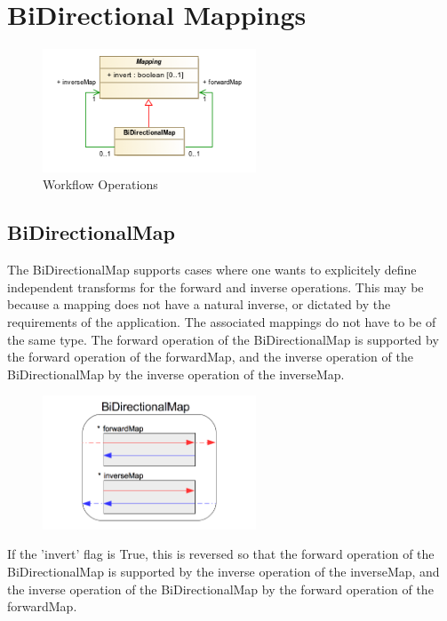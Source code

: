 \pagebreak
\section{BiDirectional Mappings}

  \begin{figure}[h]
  \begin{center}
    \includegraphics[width=2.5in]{diagrams/bidirectional_map.png}
    \caption{Workflow Operations}\label{fig:BiDirMaps}
  \end{center}
  \end{figure}

  \subsection{BiDirectionalMap}
  \label{sect:BiDirectionalMap}
    The BiDirectionalMap supports cases where one wants to explicitely define independent transforms for the forward and inverse operations. This may be because a mapping does not have a natural inverse, or dictated by the requirements of the application. The associated mappings do not have to be of the same type. The forward operation of the BiDirectionalMap is supported by the forward operation of the forwardMap, and the inverse operation of the BiDirectionalMap by the inverse operation of the inverseMap.

  \begin{figure}[h]
  \begin{center}
    \includegraphics[width=2.5in]{diagrams/bidirectional_flow.png}
  \end{center}
  \end{figure}

 If the 'invert' flag is True, this is reversed so that the forward operation of the BiDirectionalMap is supported by the inverse operation of the inverseMap, and the inverse operation of the BiDirectionalMap by the forward operation of the forwardMap.

